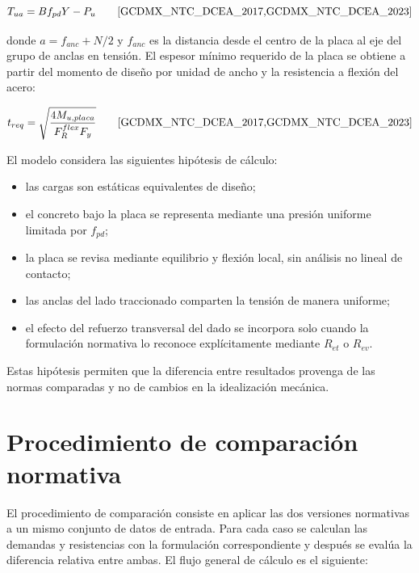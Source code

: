 \begin{equation}
  T_{ua} = Bf_{pd}Y - P_u
  \qquad \text{\cite{GCDMX_NTC_DCEA_2017,GCDMX_NTC_DCEA_2023}}
  \label{eq:met_Tua}
\end{equation}

\noindent donde $a=f_{anc}+N/2$ y $f_{anc}$ es la distancia desde el centro de la placa al eje del
grupo de anclas en tensión. El espesor mínimo requerido de la placa se obtiene a partir del momento
de diseño por unidad de ancho y la resistencia a flexión del acero:

\begin{equation}
  t_{req} = \sqrt{\frac{4M_{u,placa}}{F_R^{flex}F_y}}
  \qquad \text{\cite{GCDMX_NTC_DCEA_2017,GCDMX_NTC_DCEA_2023}}
  \label{eq:met_treq}
\end{equation}

El modelo considera las siguientes hipótesis de cálculo:

\begin{itemize}
  \item las cargas son estáticas equivalentes de diseño;
  \item el concreto bajo la placa se representa mediante una presión uniforme limitada por $f_{pd}$;
  \item la placa se revisa mediante equilibrio y flexión local, sin análisis no lineal de contacto;
  \item las anclas del lado traccionado comparten la tensión de manera uniforme;
  \item el efecto del refuerzo transversal del dado se incorpora solo cuando la formulación
    normativa lo reconoce explícitamente mediante $R_{et}$ o $R_{ev}$.
\end{itemize}

Estas hipótesis permiten que la diferencia entre resultados provenga de las normas comparadas y no
de cambios en la idealización mecánica.

\section{Procedimiento de comparación normativa}

El procedimiento de comparación consiste en aplicar las dos versiones normativas a un mismo conjunto
de datos de entrada. Para cada caso se calculan las demandas y resistencias con la formulación
correspondiente y después se evalúa la diferencia relativa entre ambas. El flujo general de cálculo
es el siguiente:

